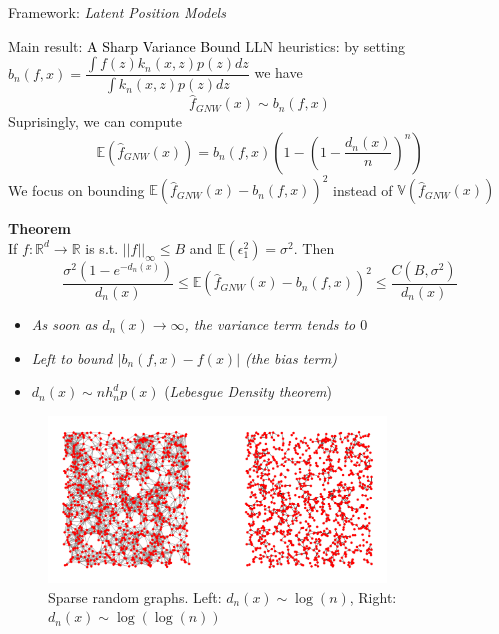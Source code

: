 \documentclass[final,dvipsnames]{beamer}
\newcommand{\myemphBLACK}[1]{\textcolor{black}{#1}}
\newcommand{\mycolbackwhite}[1]{
\hspace*{.01\linewidth}\begin{minipage}{.96\linewidth}
\begin{mdframed}[backgroundcolor=white!10,linewidth=3pt]
\vspace{10pt}
#1
\vspace{10pt}
\end{mdframed}
\end{minipage}
}
\begin{document}
\begin{frame}
\begin{columns}[T]
\begin{column}{0.49\textwidth}
\begin{block}{Framework: \textit{Latent Position Models}}
\end{block}
\begin{block}{Main result: \myemphBLACK{A Sharp Variance Bound}}
LLN heuristics: by setting $b_n(f,x)=\dfrac{\int f(z)k_n(x,z)p(z)dz}{\int k_n(x,z)p(z)dz}$ we have 
\begin{equation*}
    \hat{f}_{GNW}(x)\sim b_n(f,x)
\end{equation*}
\vspace{10pt}
Suprisingly, we can compute
\begin{equation*}
    \mathbb{E}(\hat{f}_{GNW}(x))=b_n(f,x)(1-(1-\frac{d_n(x)}{n})^n)
\end{equation*}
We focus on bounding $\mathbb{E}(\hat{f}_{GNW}(x)-b_n(f,x))^2$ instead of $\mathbb{V}(\hat{f}_{GNW}(x))$
\vspace{10pt}
\mycolbackwhite{\textbf{Theorem}
    \vspace{10pt}
    \\
    If $f\colon\mathbb{R}^d\to\mathbb{R}$ is s.t. $||f||_{\infty}\leq B$ and $\mathbb{E}(\epsilon_1^2)=\sigma^2$. 
    Then
    \begin{equation*}
        \frac{\sigma^2(1-e^{-d_n(x)})}{d_n(x)}\leq \mathbb{E}(\hat{f}_{GNW}(x)-b_n(f,x))^2\leq \frac{C(B,\sigma^2)}{d_n(x)}
    \end{equation*}
    }
    \vspace{20pt}
    \begin{itemize}
        \item \textit{As soon as $d_n(x)\to\infty$, the \textit{variance term} tends to $0$} 
        \item \textit{Left to bound $|b_n(f,x)-f(x)|$ (the \textit{bias} term)} %
        \item  $d_n(x)\sim nh_n^dp(x)$ (\textit{Lebesgue Density theorem})
    \end{itemize}
    \begin{figure}
        \centering
        \includegraphics[width=0.8\textwidth]{fresh_for_marseille.png}
        \caption{Sparse random graphs. Left: $d_n(x)\sim\log(n)$, Right: $d_n(x)\sim\log(\log(n))$}
    \end{figure}
\end{block}


\end{column}
\end{columns}
\end{frame}
\end{document}
